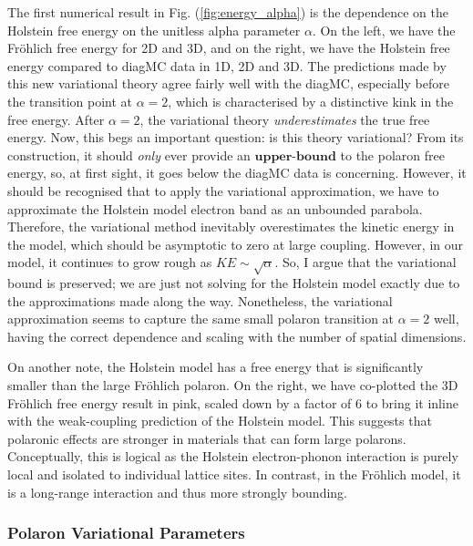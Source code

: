 The first numerical result in Fig. (\ref{fig:energy_alpha}) is the dependence on the Holstein free energy on the unitless alpha parameter $\alpha$. On the left, we have the Fr\"ohlich free energy for 2D and 3D, and on the right, we have the Holstein free energy compared to diagMC data in 1D, 2D and 3D. The predictions made by this new variational theory agree fairly well with the diagMC, especially before the transition point at $\alpha = 2$, which is characterised by a distinctive kink in the free energy. After $\alpha = 2$, the variational theory \emph{underestimates} the true free energy. Now, this begs an important question: is this theory variational? From its construction, it should \emph{only} ever provide an $\textbf{upper-bound}$ to the polaron free energy, so, at first sight, it goes below the diagMC data is concerning. However, it should be recognised that to apply the variational approximation, we have to approximate the Holstein model electron band as an unbounded parabola. Therefore, the variational method inevitably overestimates the kinetic energy in the model, which should be asymptotic to zero at large coupling. However, in our model, it continues to grow rough as $KE \sim \sqrt{\alpha}$. So, I argue that the variational bound is preserved; we are just not solving for the Holstein model exactly due to the approximations made along the way. Nonetheless, the variational approximation seems to capture the same small polaron transition at $\alpha = 2$ well, having the correct dependence and scaling with the number of spatial dimensions.

On another note, the Holstein model has a free energy that is significantly smaller than the large Fr\"ohlich polaron. On the right, we have co-plotted the 3D Fr\"ohlich free energy result in pink, scaled down by a factor of $6$ to bring it inline with the weak-coupling prediction of the Holstein model. This suggests that polaronic effects are stronger in materials that can form large polarons. Conceptually, this is logical as the Holstein electron-phonon interaction is purely local and isolated to individual lattice sites. In contrast, in the Fr\"ohlich model, it is a long-range interaction and thus more strongly bounding.

\subsubsection{Polaron Variational Parameters}

